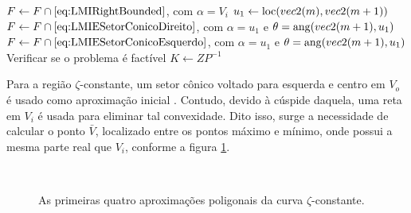 \begin{algorithm}[ht!]
\begin{algorithmic}[1]
        \State $F \gets F \cap \eqref{eq:LMIRightBounded}$, com $\alpha = V_i$ 
          \State $u_1 \gets \operatorname{loc}(vec2(m),vec2(m+1))$
            \State $F\gets F \cap \eqref{eq:LMIESetorConicoDireito}$, com $\alpha = u_1$ e $\theta = \operatorname{ang}(vec2(m+1),u_1)$ 
          \Else
            \State $F\gets F \cap \eqref{eq:LMIESetorConicoEsquerdo}$, com $\alpha = u_1$ e $\theta = \operatorname{ang}(vec2(m+1),u_1)$ 
          \EndIf
        \EndFor
        \State Verificar se o problema é factível 
    \EndWhile
    \State $K \gets ZP^{-1}$
  \end{algorithmic}
\end{algorithm} 

Para a região $\zeta$-constante, um setor cônico voltado para esquerda e centro em $V_o$ é usado como aproximação inicial \cite{WISNIEWSKI2019}. Contudo, devido à cúspide daquela, uma reta em $V_i$ é usada para eliminar tal convexidade. Dito isso, surge a necessidade de calcular o ponto $\bar{V}$, localizado entre os pontos máximo e mínimo, onde possui a mesma parte real que $V_i$, conforme a figura \ref{subfig:AproximacaoPoligonalZeta1}.

\begin{figure}[!ht]
  \centering
  \begin{subfigure}[t]{0.4\columnwidth}
      
      \caption{}
      \label{subfig:AproximacaoPoligonalZeta1}
  \end{subfigure}
  \begin{subfigure}[t]{0.4\columnwidth}
      
      \caption{}
      \label{subfig:AproximacaoPoligonalZeta2}
  \end{subfigure}
  \\
  \begin{subfigure}[t]{0.4\columnwidth}
    
    \caption{}
    \label{subfig:AproximacaoPoligonalZeta3}
  \end{subfigure}
  \begin{subfigure}[t]{0.4\columnwidth}
    
    \caption{}
    \label{subfig:AproximacaoPoligonalZeta4}
  \end{subfigure}
  \caption{As primeiras quatro aproximações poligonais da curva $\zeta$-constante.}
  \label{fig:AproximacoesPoligonalZeta}
\end{figure}

